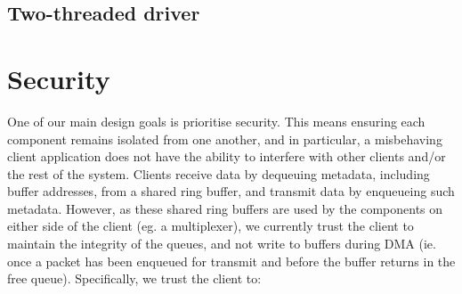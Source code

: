 \subsection{Two-threaded driver}

\section{Security}

One of our main design goals is prioritise security. This means ensuring each component remains isolated from one another, and in particular, a
misbehaving client application does not have the ability to interfere with other clients and/or the rest of the system. Clients receive
data by dequeuing metadata, including buffer addresses, from a shared ring buffer, and transmit data by enqueueing such metadata. 
However, as these shared ring buffers are used by the components on either side of the client (eg. a multiplexer), we currently 
trust the client to maintain the integrity of the queues, and not write to buffers during DMA (ie. once a packet has been enqueued
for transmit and before the buffer returns in the free queue). Specifically, we trust the client to:
